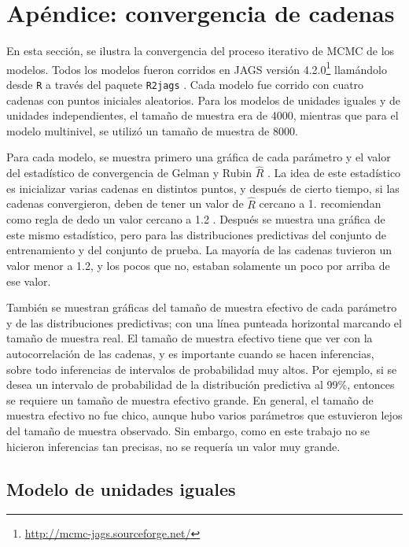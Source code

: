 
\section*{Apéndice: convergencia de cadenas}
\label{sec:appendix}

En esta sección, se ilustra la convergencia del proceso iterativo de MCMC de los modelos. Todos los modelos fueron corridos en JAGS versión 4.2.0\footnote{\url{http://mcmc-jags.sourceforge.net/}} llamándolo desde \texttt{R} \cite{ihaka1996r} a través del paquete \texttt{R2jags} \cite{su2015r2jags}. Cada modelo fue corrido con cuatro cadenas con puntos iniciales aleatorios. Para los modelos de unidades iguales y de unidades independientes, el tamaño de muestra era de 4000, mientras que para el modelo multinivel, se utilizó un tamaño de muestra de 8000.

Para cada modelo, se muestra primero una gráfica de cada parámetro y el valor del estadístico de convergencia de Gelman y Rubin $\hat{R}$ \cite{gelman2014bayesian} \cite{kruschke2014doing}. La idea de este estadístico es inicializar varias cadenas en distintos puntos, y después de cierto tiempo, si las cadenas convergieron, deben de tener un valor de $\hat{R}$ cercano a 1. \citeauthor{brooks1998general} recomiendan como regla de dedo un valor cercano a 1.2 \cite{brooks1998general}. Después se muestra una gráfica de este mismo estadístico, pero para las distribuciones predictivas del conjunto de entrenamiento y del conjunto de prueba. La mayoría de las cadenas tuvieron un valor menor a 1.2, y los pocos que no, estaban solamente un poco por arriba de ese valor.

También se muestran gráficas del tamaño de muestra efectivo de cada parámetro y de las distribuciones predictivas; con una línea punteada horizontal marcando el tamaño de muestra real. El tamaño de muestra efectivo tiene que ver con la autocorrelación de las cadenas, y es importante cuando se hacen inferencias, sobre todo inferencias de intervalos de probabilidad muy altos. Por ejemplo, si se desea un intervalo de probabilidad de la distribución predictiva al 99\%, entonces se requiere un tamaño de muestra efectivo grande. En general, el tamaño de muestra efectivo no fue chico, aunque hubo varios parámetros que estuvieron lejos del tamaño de muestra observado. Sin embargo, como en este trabajo no se hicieron inferencias tan precisas, no se requería un valor muy grande.


\subsection*{Modelo de unidades iguales}

